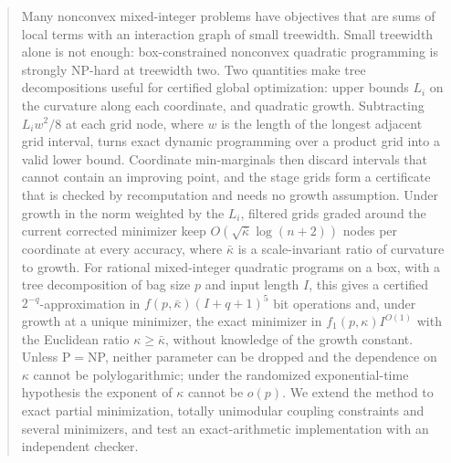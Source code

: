 \begin{abstract}
Many nonconvex mixed-integer problems have objectives that are sums of local
terms with an interaction graph of small treewidth. Small treewidth alone is
not enough: box-constrained nonconvex quadratic programming is strongly
NP-hard at treewidth two. Two quantities make tree decompositions useful for
certified global optimization: upper bounds $L_i$ on the curvature along each
coordinate, and quadratic growth. Subtracting $L_iw^2/8$ at each grid node,
where $w$ is the length of the longest adjacent grid interval, turns exact dynamic
programming over a product grid into a valid lower bound. Coordinate
min-marginals then discard intervals that cannot contain an improving point, and the stage
grids form a certificate that is checked by recomputation and needs no growth
assumption. Under growth in the norm weighted by the $L_i$, filtered grids
graded around the current corrected minimizer keep
$O(\sqrt{\bar\kappa}\log(n+2))$ nodes per coordinate at every accuracy, where
$\bar\kappa$ is a scale-invariant ratio of curvature to growth. For rational
mixed-integer quadratic programs on a box, with a tree decomposition of bag
size $p$ and input length $I$, this gives a certified $2^{-q}$-approximation
in $f(p,\bar\kappa)(I+q+1)^5$ bit operations and, under growth at a unique
minimizer, the exact minimizer in $f_1(p,\kappa)I^{O(1)}$ with the Euclidean ratio
$\kappa\ge\bar\kappa$, without knowledge of the growth constant. Unless
P${}={}$NP, neither parameter can be dropped and the dependence on $\kappa$
cannot be polylogarithmic; under the randomized exponential-time hypothesis
the exponent of $\kappa$ cannot be $o(p)$. We extend the method to exact
partial minimization, totally unimodular coupling constraints and several
minimizers, and test an exact-arithmetic implementation with an independent
checker.
\end{abstract}
